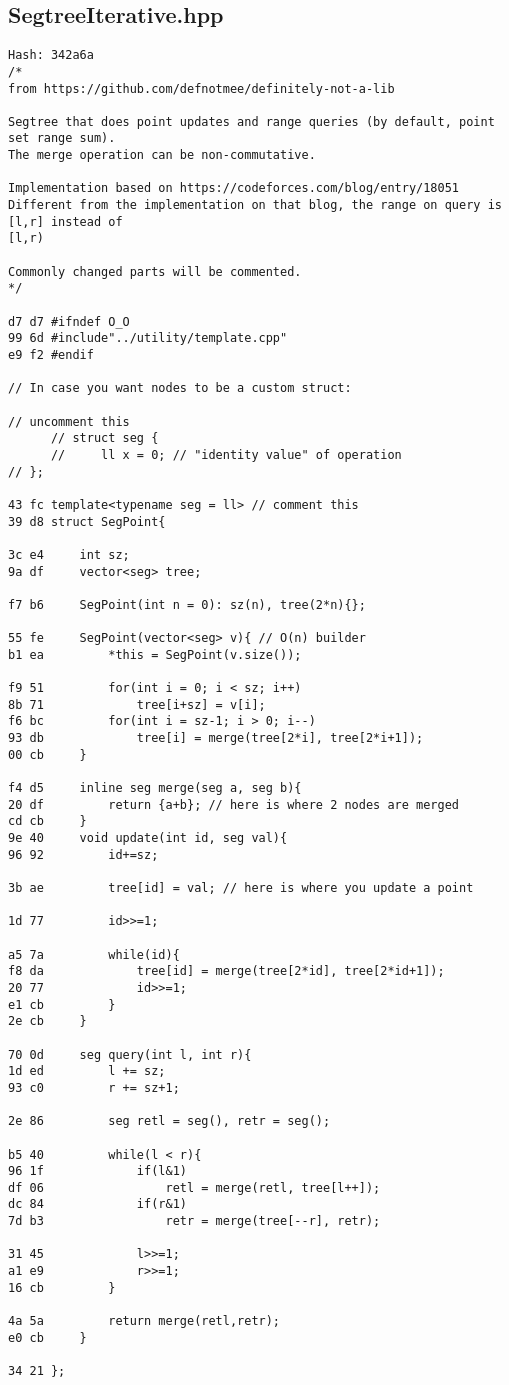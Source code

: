 \documentclass[11pt, a4paper, twoside]{article}
\begin{document}
\subsection{SegtreeIterative.hpp}
\begin{lstlisting}
Hash: 342a6a
/*
from https://github.com/defnotmee/definitely-not-a-lib

Segtree that does point updates and range queries (by default, point set range sum). 
The merge operation can be non-commutative. 

Implementation based on https://codeforces.com/blog/entry/18051
Different from the implementation on that blog, the range on query is [l,r] instead of
[l,r)

Commonly changed parts will be commented.
*/

d7 d7 #ifndef O_O
99 6d #include"../utility/template.cpp"
e9 f2 #endif

// In case you want nodes to be a custom struct:

// uncomment this
      // struct seg {
      //     ll x = 0; // "identity value" of operation
// };

43 fc template<typename seg = ll> // comment this
39 d8 struct SegPoint{
      
3c e4     int sz;
9a df     vector<seg> tree;
      
f7 b6     SegPoint(int n = 0): sz(n), tree(2*n){};
      
55 fe     SegPoint(vector<seg> v){ // O(n) builder
b1 ea         *this = SegPoint(v.size());
      
f9 51         for(int i = 0; i < sz; i++)
8b 71             tree[i+sz] = v[i];
f6 bc         for(int i = sz-1; i > 0; i--)
93 db             tree[i] = merge(tree[2*i], tree[2*i+1]);
00 cb     }
      
f4 d5     inline seg merge(seg a, seg b){ 
20 df         return {a+b}; // here is where 2 nodes are merged
cd cb     }
9e 40     void update(int id, seg val){
96 92         id+=sz;
      
3b ae         tree[id] = val; // here is where you update a point
      
1d 77         id>>=1;
      
a5 7a         while(id){
f8 da             tree[id] = merge(tree[2*id], tree[2*id+1]);
20 77             id>>=1;
e1 cb         }
2e cb     }
      
70 0d     seg query(int l, int r){
1d ed         l += sz;
93 c0         r += sz+1;
              
2e 86         seg retl = seg(), retr = seg();
      
b5 40         while(l < r){
96 1f             if(l&1)
df 06                 retl = merge(retl, tree[l++]);
dc 84             if(r&1)
7d b3                 retr = merge(tree[--r], retr);
      
31 45             l>>=1;
a1 e9             r>>=1;
16 cb         }
      
4a 5a         return merge(retl,retr);
e0 cb     }
      
34 21 };
\end{lstlisting}
\end{document}
